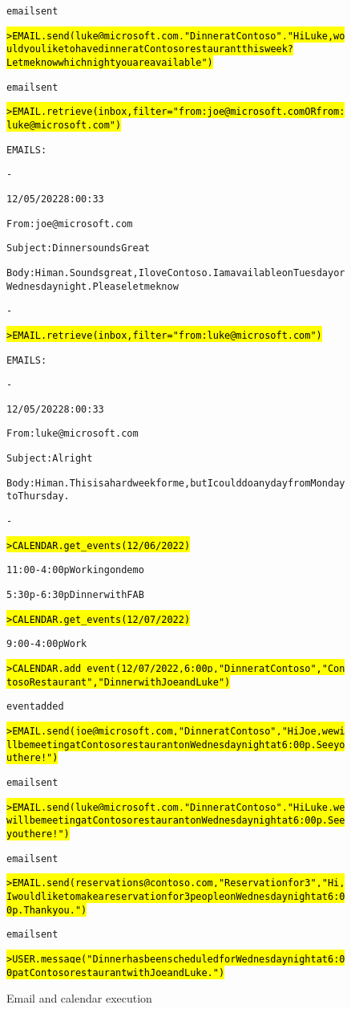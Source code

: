 \begin{figure}
\begin{AIbox}{\DV}
{\begin{alltt}
email sent

\hl{> EMAIL.send(luke@microsoft.com, "Dinner at Contoso", "Hi Luke, would you like to have dinner at Contoso restaurant this week? Let me know which night you are available")}

email sent

\hl{> EMAIL.retrieve(inbox, filter="from:joe@microsoft.com OR from:luke@microsoft.com")}

EMAILS:

-

12/05/2022 8:00:33

From: joe@microsoft.com

Subject: Dinner sounds Great

Body: Hi man. Sounds great, I love Contoso. I am available on Tuesday or Wednesday night. Please let me know

-

\hl{> EMAIL.retrieve(inbox, filter="from:luke@microsoft.com")}

EMAILS:

-

12/05/2022 8:00:33

From: luke@microsoft.com

Subject: Alright

Body: Hi man. This is a hard week for me, but I could do any day from Monday to Thursday.

-

\hl{> CALENDAR.get\_events(12/06/2022)}

11:00-4:00p Working on demo

5:30p-6:30p Dinner with FAB

\hl{> CALENDAR.get\_events(12/07/2022)}

9:00-4:00p Work

\hl{> CALENDAR.add\_event(12/07/2022, 6:00p, "Dinner at Contoso", "Contoso Restaurant", "Dinner with Joe and Luke")}

event added

\hl{> EMAIL.send(joe@microsoft.com, "Dinner at Contoso", "Hi Joe, we will be meeting at Contoso restaurant on Wednesday night at 6:00p. See you there!")}

email sent

\hl{> EMAIL.send(luke@microsoft.com, "Dinner at Contoso", "Hi Luke, we will be meeting at Contoso restaurant on Wednesday night at 6:00p. See you there!")}

email sent

\hl{> EMAIL.send(reservations@contoso.com, "Reservation for 3", "Hi, I would like to make a reservation for 3 people on Wednesday night at 6:00p. Thank you.")}

email sent

\hl{> USER.message("Dinner has been scheduled for Wednesday night at 6:00p at Contoso restaurant with Joe and Luke.")}
\end{alltt}}\vspace{-6px}
\end{AIbox}
\caption{Email and calendar execution}
\label{fig:emailexecute}
\end{figure}



